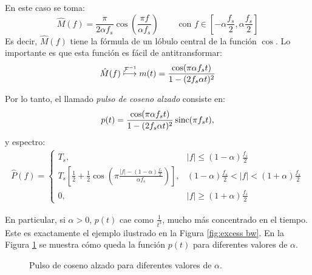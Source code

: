 \begin{ejemplo}
En este caso se toma:
\begin{equation*}
    \hat{M}(f)=\frac{\pi}{2 \alpha f_s}\cos\left(\frac{\pi f}{\alpha f_s}\right)\qquad \text{ con }f \in \left[-\alpha\frac{f_s}{2},\alpha\frac{f_s}{2}\right]
\end{equation*}
Es decir, $\hat{M}(f)$ tiene la fórmula de un lóbulo central de la función $\cos$. Lo importante es que esta función es fácil de antitransformar:
\begin{equation*}
    \hat{M}(f) \;\displaystyle{\mathop{\longmapsto}^{\mathcal{F}^{-1}}}\; m(t) = \frac{\cos(\pi \alpha f_s t)}{1-(2 f_s \alpha t)^2}
\end{equation*}

Por lo tanto, el llamado \emph{pulso de coseno alzado} consiste en:
\begin{equation*}
    p(t) = \frac{\cos(\pi \alpha f_s t)}{1-(2 f_s \alpha t)^2} \operatorname{sinc}(\pi f_s t),
\end{equation*}
y espectro:
\begin{align*}
\hat{P}(f)  =
\begin{cases}
 T_s, & |f| \leq (1-\alpha) \frac{f_s}{2}  \\
 T_s \left[\frac{1}{2} + \frac{1}{2} \cos\left(\pi
\frac{|f|-(1-\alpha) \frac{f_s}{2} } {\alpha f_s} \right)\right], &
(1-\alpha) \frac{f_s}{2}  < |f| <
(1+\alpha) \frac{f_s}{2}  \\
0,&  |f| \geq (1+\alpha) \frac{ f_s}{2}
\end{cases}
\end{align*}

En particular, si $\alpha>0$, $p(t)$ cae como $\frac{1}{t^3}$, mucho más concentrado en el tiempo. Este es exactamente el ejemplo ilustrado en la Figura \ref{fig:excess bw}. En la Figura \ref{fig:coseno alzado} se muestra cómo queda la función $p(t)$ para diferentes valores de $\alpha$.
\end{ejemplo}

\begin{figure}
    \begin{center}
        \caption{Pulso de coseno alzado para diferentes valores de $\alpha$.}\label{fig:coseno alzado}
    \end{center}
\end{figure}

